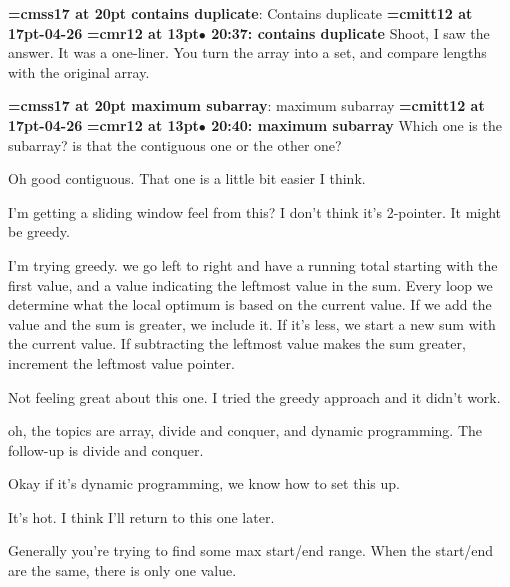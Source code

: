 {\medskip\noindent\bf\font\titlefont=cmss17 at 20pt contains duplicate}: Contains duplicate
{\medskip\noindent\bf\font\titlefont=cmitt12 at 17pt-04-26}\medskip
{\smallskip\noindent\bf\font\titlefont=cmr12 at 13pt\titlefont $\bullet$ 20:37: contains duplicate}\smallskip
Shoot, I saw the answer. It was a one-liner. You turn the array into a set, and compare lengths with the original array.
\par

{\medskip\noindent\bf\font\titlefont=cmss17 at 20pt maximum subarray}: maximum subarray
{\medskip\noindent\bf\font\titlefont=cmitt12 at 17pt-04-26}\medskip
{\smallskip\noindent\bf\font\titlefont=cmr12 at 13pt\titlefont $\bullet$ 20:40: maximum subarray}\smallskip
Which one is the subarray? is that the contiguous one or the other one?
\par

Oh good contiguous. That one is a little bit easier I think.
\par

I'm getting a sliding window feel from this? I don't think it's 2-pointer. It might be greedy.
\par

I'm trying greedy. we go left to right and have a running total starting with the first value, and a value indicating the leftmost value in the sum. Every loop we determine what the local optimum is based on the current value. If we add the value and the sum is greater, we include it. If it's less, we start a new sum with the current value. If subtracting the leftmost value makes the sum greater, increment the leftmost value pointer.
\par

Not feeling great about this one. I tried the greedy approach and it didn't work.
\par

oh, the topics are array, divide and conquer, and dynamic programming. The follow-up is divide and conquer.
\par

Okay if it's dynamic programming, we know how to set this up.
\par

It's hot. I think I'll return to this one later.
\par

Generally you're trying to find some max start/end range. When the start/end are the same, there is only one value.
\par


